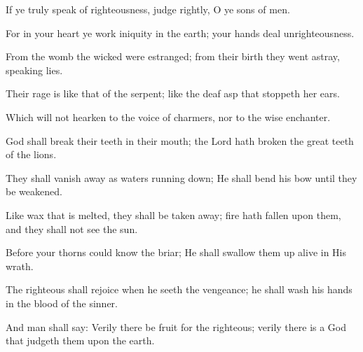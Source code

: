If ye truly speak of righteousness, judge rightly, O ye sons of men.

For in your heart ye work iniquity in the earth; your hands deal unrighteousness.

From the womb the wicked were estranged; from their birth they went astray, speaking lies.

Their rage is like that of the serpent; like the deaf asp that stoppeth her ears.

Which will not hearken to the voice of charmers, nor to the wise enchanter.

God shall break their teeth in their mouth; the Lord hath broken the great teeth of the lions.

They shall vanish away as waters running down; He shall bend his bow until they be weakened.

Like wax that is melted, they shall be taken away; fire hath fallen upon them, and they shall not see the sun.

Before your thorns could know the briar; He shall swallow them up alive in His wrath.

The righteous shall rejoice when he seeth the vengeance; he shall wash his hands in the blood of the sinner.

And man shall say: Verily there be fruit for the righteous; verily there is a God that judgeth them upon the earth.
